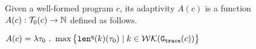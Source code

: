 
\begin{defn}
    \label{def:trace_adapt}
    Given a well-formed program ${c}$, 
    its adaptivity $A(c)$ is a function 
    $A(c) : \mathcal{T}_0(c)\to \mathbb{N}$
    defined as follows.
\begin{center}
$
    A(c) = \lambda \mathtt{\tau}_0 ~.~ \max \big 
    \{ \mathtt{len}^{\tt q}(k)(\mathtt{\tau}_0) \mid k \in \mathcal{WK}(\mathtt{{G_{trace}}}(c)) \big \} 
$
\end{center}
\end{defn}

